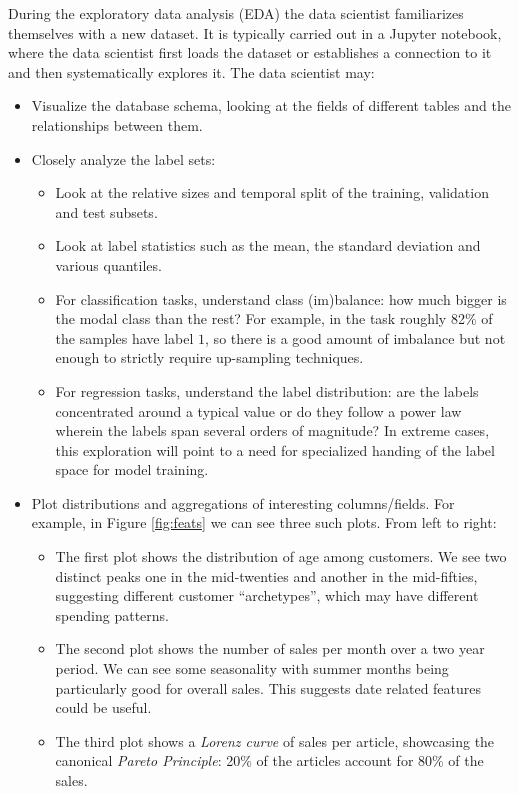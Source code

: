 During the exploratory data analysis (EDA) the data scientist familiarizes themselves with a new dataset. It is typically carried out in a Jupyter notebook, where the data scientist first loads the dataset or establishes a connection to it and then systematically explores it. The data scientist may:
\begin{itemize}
    \item Visualize the database schema, looking at the fields of different tables and the relationships between them.
    \item Closely analyze the label sets:
        \begin{itemize}
            \item Look at the relative sizes and temporal split of the training, validation and test subsets.
            \item Look at label statistics such as the mean, the standard deviation and various quantiles. 
            \item For classification tasks, understand class (im)balance: how much bigger is the modal class than the rest? For example, in the \userChurn task roughly 82\% of the samples have label $1$, so there is a good amount of imbalance but not enough to strictly require up-sampling techniques.
            \item For regression tasks, understand the label distribution: are the labels concentrated around a typical value or do they follow a power law wherein the labels span several orders of magnitude? In extreme cases, this exploration will point to a need for specialized handing of the label space for model training.
        \end{itemize}
    \item Plot distributions and aggregations of interesting columns/fields. For example, in Figure \ref{fig:feats} we can see three such plots. From left to right:
    \begin{itemize}
        \item The first plot shows the distribution of age among customers. We see two distinct peaks one in the mid-twenties and another in the mid-fifties, suggesting different customer ``archetypes'', which may have different spending patterns.
        \item The second plot shows the number of sales per month over a two year period. We can see some seasonality with summer months being particularly good for overall sales. This suggests date related features could be useful.
        \item The third plot shows a \emph{Lorenz curve} of sales per article, showcasing the canonical \emph{Pareto Principle}: 20\% of the articles account for 80\% of the sales.

\end{itemize}
\end{itemize}
